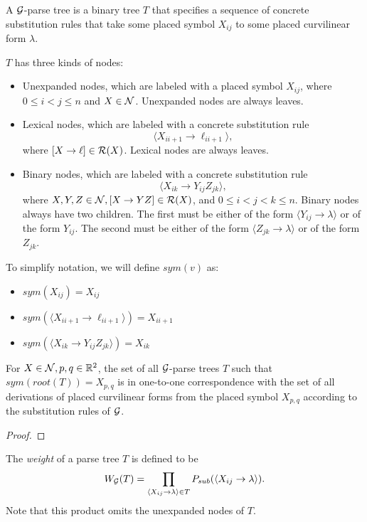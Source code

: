 \documentclass{article}
\begin{document}
\begin{defn}
  A ${\mathcal G}$-parse tree is a binary tree $T$ that specifies a sequence
  of concrete substitution rules that take some placed symbol $X_{ij}$
  to some placed curvilinear form $\lambda$.

  $T$ has three kinds of nodes:
  \begin{itemize}
  \item Unexpanded nodes, which are labeled with a placed symbol
    $X_{ij}$, where $0\le i < j \le n$ and $X\in {\mathcal N}$. Unexpanded
    nodes are always leaves.
  \item Lexical nodes, which are labeled with a concrete substitution
    rule $$\langle X_{i i+1} \to \ell_{i i+1}\rangle,$$ where $[X\to \ell]\in
    {\mathcal R}(X)$. Lexical nodes are always leaves.
  \item Binary nodes, which are labeled with a concrete substitution
    rule $$\langle X_{ik}\to Y_{ij} Z_{jk}\rangle,$$ where $X,Y,Z\in
    {\mathcal N}, [X\to YZ]\in {\mathcal R}(X)$, and $0 \le i < j < k \le n$. Binary
    nodes always have two children. The first must be either of the
    form $\langle Y_{ij} \to \lambda \rangle$ or of the form $Y_{ij}$.
    The second must be either of the form $\langle Z_{jk} \to \lambda
    \rangle$ or of the form $Z_{jk}$.
  \end{itemize}
\end{defn}

To simplify notation, we will define $sym(v)$ as:
\begin{itemize}
\item $sym(X_{ij}) = X_{ij}$
\item $sym(\langle X_{i i+1} \to \ell_{i i+1}\rangle) = X_{i i+1}$
\item $sym(\langle X_{ik} \to Y_{ij} Z_{jk}\rangle) = X_{i k}$
\end{itemize}

\begin{prop}
  For $X\in {\mathcal N}, p,q\in \mathbb{R}^2$, the set of all ${\mathcal G}$-parse trees $T$
  such that $sym(root(T)) = X_{p,q}$ is in one-to-one correspondence
  with the set of all derivations of placed curvilinear forms from the
  placed symbol $X_{p,q}$ according to the substitution rules of
  ${\mathcal G}$.
\end{prop}
\begin{proof}
\end{proof}

\begin{defn}
The \emph{weight} of a parse tree $T$ is defined to be
$$ W_{{\mathcal G}}(T) = \prod_{\langle X_{ij} \to \lambda \rangle\in T} P_{sub}(
\langle X_{ij} \to \lambda \rangle).$$ Note that this product omits
the unexpanded nodes of $T$.
\end{defn}
\end{document}
